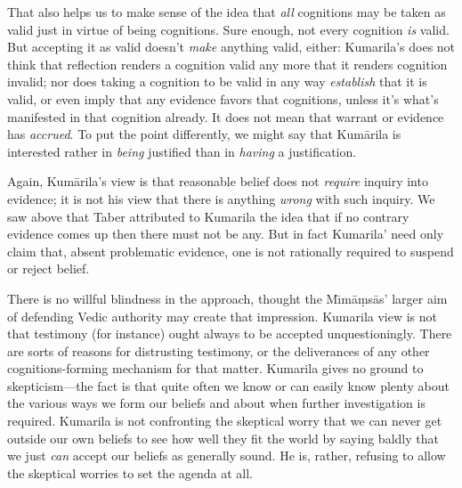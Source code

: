 ﻿\documentclass[11pt]{amsart}
\begin{document}
That also helps us to make sense of the idea that \emph{all} cognitions may be taken as valid just in virtue of being cognitions. Sure enough, not every cognition \emph{is} valid. But accepting it as valid doesn't \emph{make} anything valid, either: Kumarila's does not think that reflection renders a cognition valid any more that it renders cognition invalid; nor does taking a cognition to be valid in any way \emph{establish} that it is valid, or even imply that any evidence favors that cognitions, unless it's what's manifested in that cognition already. It does not mean that warrant or evidence has \emph{accrued}. To put the point differently, we might say that Kum\=arila is interested rather in \emph{being} justified than in \emph{having} a justification.



Again, Kum\=arila's view is that reasonable belief does not \emph{require} inquiry into evidence; it is not his view that there is anything \emph{wrong} with such inquiry. We saw above that Taber attributed to Kumarila the idea that if no contrary evidence comes up then there must not be any. But in fact Kumarila' need only claim that, absent problematic evidence, one is not rationally required to suspend or reject belief.

There is no willful blindness in the approach, thought the M\={\i}m\=a\d ms\=as' larger aim of defending Vedic authority may create that impression. Kumarila view is not that testimony (for instance) ought always to be accepted unquestioningly. There are sorts of reasons for distrusting testimony, or the deliverances of any other cognitions-forming mechanism for that matter. Kumarila gives no ground to skepticism---the fact is that quite often we know or can easily know plenty about the various ways we form our beliefs and about when further investigation is required. Kumarila is not confronting the skeptical worry that we can never get outside our own beliefs to see how well they fit the world by saying baldly that we just \emph{can} accept our beliefs as generally sound. He is, rather, refusing to allow the skeptical worries to set the agenda at all.





\end{document}
